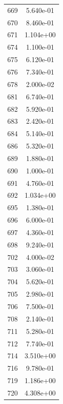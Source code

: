 \documentclass[12pt]{article}
\begin{document}
\begin{longtable}{@{}cc@{}}
669 & 5.640e-01 \\
670 & 8.460e-01 \\
671 & 1.104e+00 \\
674 & 1.100e-01 \\
675 & 6.120e-01 \\
676 & 7.340e-01 \\
678 & 2.000e-02 \\
681 & 6.740e-01 \\
682 & 5.920e-01 \\
683 & 2.420e-01 \\
684 & 5.140e-01 \\
686 & 5.320e-01 \\
689 & 1.880e-01 \\
690 & 1.000e-01 \\
691 & 4.760e-01 \\
692 & 1.034e+00 \\
695 & 1.380e-01 \\
696 & 6.000e-01 \\
697 & 4.360e-01 \\
698 & 9.240e-01 \\
702 & 4.000e-02 \\
703 & 3.060e-01 \\
704 & 5.620e-01 \\
705 & 2.980e-01 \\
706 & 7.500e-01 \\
708 & 2.140e-01 \\
711 & 5.280e-01 \\
712 & 7.740e-01 \\
714 & 3.510e+00 \\
716 & 9.780e-01 \\
719 & 1.186e+00 \\
720 & 4.308e+00 \\

\bottomrule
\end{longtable}
\end{document}
